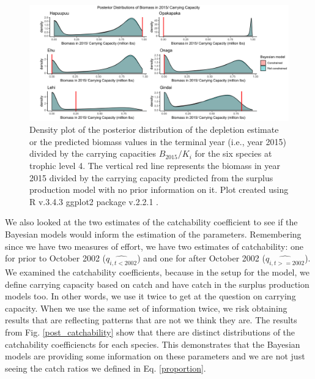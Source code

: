 \documentclass[oneside,12pt,final]{sty/ucthesis-CA2012}
\let\cite\citep                             %
\begin{document}
\begin{mainmatter}
\begin{figure}[H]
     \centering
       \includegraphics[width=\textwidth]{fig/post_terminal_bio_k}
    \caption{Density plot of the posterior distribution of the depletion estimate or the predicted biomass values in the terminal year (i.e., year 2015) divided by the carrying capacities $B_{2015}/K_i$ for the six species at trophic level 4. The vertical red line represents the biomass in year 2015 divided by the carrying capacity predicted from the surplus production model with no prior information on it. Plot created using R v.3.4.3 \cite{Rcite} ggplot2 package v.2.2.1 \cite{ggplot}.}
    \label{post_term_b_k}
\end{figure}

We also looked at the two estimates of the catchability coefficient to see if the Bayesian models would inform the estimation of the parameters. Remembering since we have two measures of effort, we have two estimates of catchability: one for prior to October 2002 ($\widehat{q_{i,t<2002}}$) and one for after October 2002 ($\widehat{q_{i,t>=2002}}$). We examined the catchability coefficients, because in the setup for the model, we define carrying capacity based on catch and  have catch in the surplus production models too. In other words, we use it twice to get at the question on carrying capacity. When we use the same set of information twice, we risk obtaining results that are reflecting patterns that are not we think they are. The results from Fig. \ref{post_catchability} show that there are distinct distributions of the catchability coefficiencts for each species. This demonstrates that the Bayesian models are providing some information on these parameters and we are not just seeing the catch ratios we defined in Eq. \ref{proportion}.


\end{mainmatter}
\end{document}
